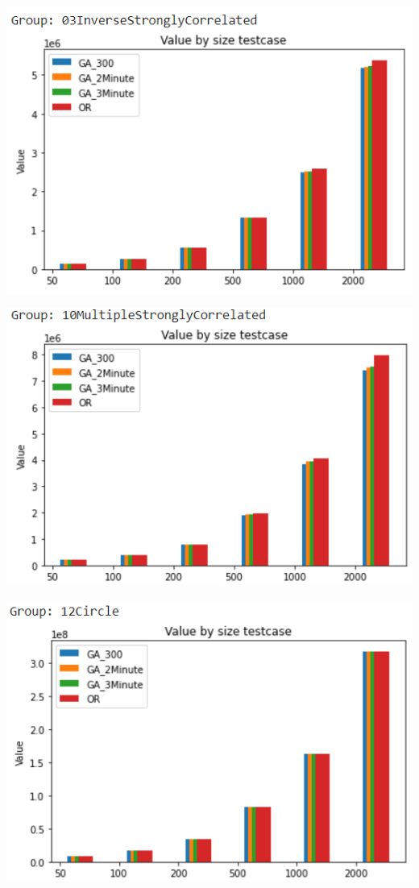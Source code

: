 \documentclass{article}
\begin{document}
\begin{center}
    \centering
    \includegraphics[width=15cm]{image/AI14.png}
\end{center}
\begin{center}
    \centering
    \includegraphics[width=15cm]{image/AI15.png}
\end{center}
\begin{center}
    \centering
    \includegraphics[width=15cm]{image/AI16.png}
\end{center}
\end{document}
